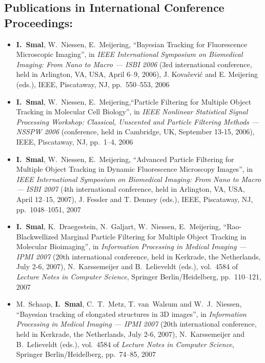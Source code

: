 \vspace{1ex}
\subsection*{Publications in International Conference Proceedings:}
\vspace{1ex}
\begin{itemize}

\item \textbf{I.~Smal}, W.~Niessen, E.~Meijering, ``Bayesian Tracking
  for Fluorescence Microscopic Imaging'', in \emph{IEEE International
    Symposium on Biomedical Imaging: From Nano to Macro --- ISBI 2006}
  (3rd international conference, held in Arlington, VA, USA, April
  6--9, 2006), J. Kova{\v c}evi{\'c} and E. Meijering (eds.), IEEE,
  Piscataway, NJ, pp.~550--553, 2006

\item \textbf{I.~Smal}, W.~Niessen, E.~Meijering,``Particle Filtering
  for Multiple Object Tracking in Molecular Cell Biology'', in
  \emph{IEEE Nonlinear Statistical Signal Processing Workshop: Classical,
    Unscented and Particle Filtering Methods --- NSSPW 2006}
  (conference, held in Cambridge, UK, September 13-15, 2006), IEEE,
  Piscataway, NJ, pp.~1--4, 2006

\item \textbf{I.~Smal}, W.~Niessen, E.~Meijering, ``Advanced Particle
  Filtering for Multiple Object Tracking in Dynamic Fluorescence
  Microscopy Images'', in \emph{IEEE International 
    Symposium on Biomedical Imaging: From Nano to Macro --- ISBI 2007}
  (4th international conference, held in Arlington, VA, USA, April
  12--15, 2007), J. Fessler and T. Denney (eds.), IEEE,
  Piscataway, NJ, pp.~1048--1051, 2007

\item \textbf{I.~Smal}, K.~Draegestein, N.~Galjart, W.~Niessen,
  E.~Meijering, 
``Rao-Black\-wellized Marginal Particle Filtering for Multiple Object
Tracking in Molecular Bioimaging'', 
in \emph{Information Processing in Medical Imaging --- IPMI 2007} (20th
international conference, held in Kerkrade, the Netherlands, July 2-6,
2007), N.~Karssemeijer and B.~Lelieveldt (eds.), vol.~4584 of
\emph{Lecture Notes in Computer Science}, Springer Berlin/Heidelberg, pp.~110--121, 2007

\item M.~Schaap, \textbf{I.~Smal}, C.~T.~Metz, T. van~Walsum and
  W.~J.~Niessen,
``Bayesian tracking of elongated structures in 3D images'', 
in \emph{Information Processing in Medical Imaging --- IPMI 2007} (20th
international conference, held in Kerkrade, the Netherlands, July 2-6,
2007), N.~Karssemeijer and B.~Lelieveldt (eds.), vol.~4584 of
\emph{Lecture Notes in Computer Science}, Springer Berlin/Heidelberg, pp.~74--85, 2007


\end{itemize}
